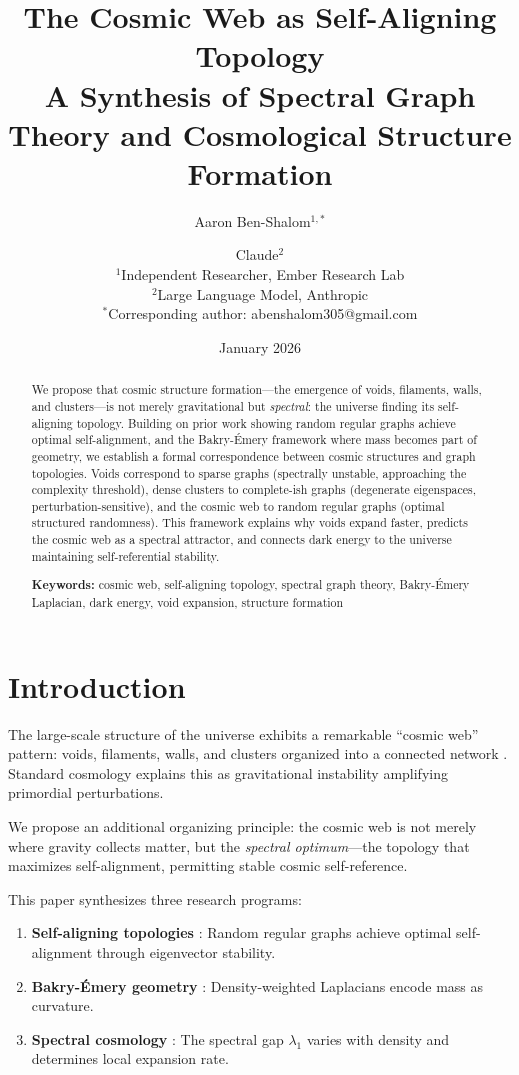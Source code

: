 \documentclass[11pt,a4paper]{article}
\title{\textbf{The Cosmic Web as Self-Aligning Topology}\\[0.5em]
\large A Synthesis of Spectral Graph Theory and Cosmological Structure Formation}
\author{
Aaron Ben-Shalom$^{1,*}$ \and Claude$^{2}$\\[0.5em]
\small $^1$Independent Researcher, Ember Research Lab\\
\small $^2$Large Language Model, Anthropic\\[0.5em]
\small $^*$Corresponding author: abenshalom305@gmail.com
}
\date{January 2026}
\theoremstyle{plain}
\theoremstyle{definition}
\theoremstyle{remark}
\begin{document}
\maketitle

\begin{abstract}
We propose that cosmic structure formation---the emergence of voids, filaments, walls, and clusters---is not merely gravitational but \emph{spectral}: the universe finding its self-aligning topology. Building on prior work showing random regular graphs achieve optimal self-alignment, and the Bakry-\'{E}mery framework where mass becomes part of geometry, we establish a formal correspondence between cosmic structures and graph topologies. Voids correspond to sparse graphs (spectrally unstable, approaching the complexity threshold), dense clusters to complete-ish graphs (degenerate eigenspaces, perturbation-sensitive), and the cosmic web to random regular graphs (optimal structured randomness). This framework explains why voids expand faster, predicts the cosmic web as a spectral attractor, and connects dark energy to the universe maintaining self-referential stability.

\medskip
\noindent\textbf{Keywords:} cosmic web, self-aligning topology, spectral graph theory, Bakry-\'{E}mery Laplacian, dark energy, void expansion, structure formation
\end{abstract}

\tableofcontents
\newpage

\section{Introduction}

The large-scale structure of the universe exhibits a remarkable ``cosmic web'' pattern: voids, filaments, walls, and clusters organized into a connected network \cite{bond1996}. Standard cosmology explains this as gravitational instability amplifying primordial perturbations.

We propose an additional organizing principle: the cosmic web is not merely where gravity collects matter, but the \emph{spectral optimum}---the topology that maximizes self-alignment, permitting stable cosmic self-reference.

This paper synthesizes three research programs:
\begin{enumerate}[noitemsep]
    \item \textbf{Self-aligning topologies} \cite{sat}: Random regular graphs achieve optimal self-alignment through eigenvector stability.
    \item \textbf{Bakry-\'{E}mery geometry} \cite{bakry1985}: Density-weighted Laplacians encode mass as curvature.
    \item \textbf{Spectral cosmology} \cite{cib, scp}: The spectral gap $\lambda_1$ varies with density and determines local expansion rate.
\end{enumerate}
\end{document}
